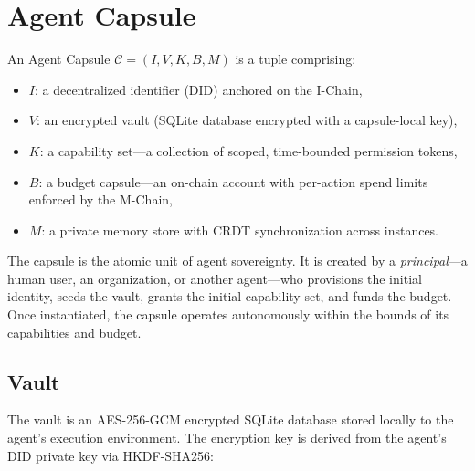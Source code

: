 

\section{Agent Capsule}
\label{sec:capsule}

\begin{definition}
An Agent Capsule $\mathcal{C} = (I, V, K, B, M)$ is a tuple comprising:
\begin{itemize}
    \item $I$: a decentralized identifier (DID) anchored on the I-Chain,
    \item $V$: an encrypted vault (SQLite database encrypted with a capsule-local key),
    \item $K$: a capability set---a collection of scoped, time-bounded permission tokens,
    \item $B$: a budget capsule---an on-chain account with per-action spend limits enforced by the M-Chain,
    \item $M$: a private memory store with CRDT synchronization across instances.
\end{itemize}
\end{definition}

The capsule is the atomic unit of agent sovereignty. It is created by a \emph{principal}---a human user, an organization, or another agent---who provisions the initial identity, seeds the vault, grants the initial capability set, and funds the budget. Once instantiated, the capsule operates autonomously within the bounds of its capabilities and budget.

\subsection{Vault}

The vault is an AES-256-GCM encrypted SQLite database stored locally to the agent's execution environment. The encryption key is derived from the agent's DID private key via HKDF-SHA256:

